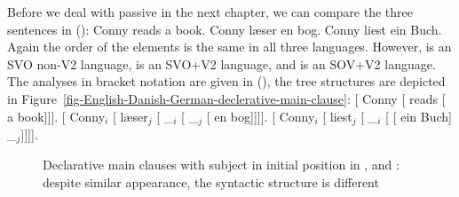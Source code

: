 \largerpage
Before we deal with passive in the next chapter, we can compare the three sentences in ():
\eal
\ex Conny reads a book.
\ex Conny læser en bog.
\ex Conny liest ein Buch.
\zl
Again the order of the elements is the same in all three languages. However,  is an SVO
non-V2 language,  is an SVO+V2 language, and  is an SOV+V2 language. The analyses in
bracket notation are given in (), the tree structures are depicted in Figure~\vref{fig-English-Danish-German-declerative-main-clause}:
\eal
\ex {}[ Conny [ reads [ a book]]].
\ex {}[ Conny$_i$ [ læser$_j$ [ \_$_i$ [  \_$_j$ [ en bog]]]].
\ex {}[ Conny$_i$ [ liest$_j$ [ \_$_i$ [\sub{\vbar} [ ein Buch] \_$_j$]]]].
\zl
\begin{figure}
\hfill
{}
\hfill
{}
\caption{\label{fig-English-Danish-German-declerative-main-clause}Declarative main clauses with
  subject in initial position in ,  and : despite similar appearance, the
  syntactic structure is different}
\end{figure}

